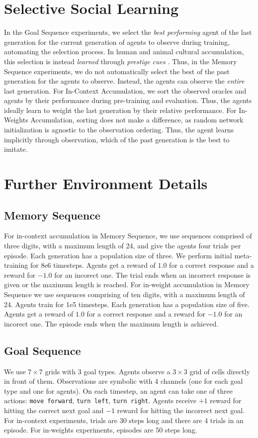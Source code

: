 \documentclass{article}
\begin{document}
\section{Selective Social Learning}
\label{selective}
In the Goal Sequence experiments, we select the \textit{best performing} agent of the last generation for the current generation of agents to observe during training, automating the selection process. In human and animal cultural accumulation, this selection is instead \textit{learned} through \textit{prestige cues} \cite{barkow1975prestige, horner2010prestige}. Thus, in the Memory Sequence experiments, we do not automatically select the best of the past generation for the agents to observe. Instead, the agents can observe the \textit{entire} last generation. For In-Context Accumulation, we sort the observed oracles and agents by their performance during pre-training and evaluation. Thus, the agents ideally learn to weight the last generation by their relative performance. For In-Weights Accumulation, sorting does not make a difference, as random network initialization is agnostic to the observation ordering. Thus, the agent learns implicitly through observation, which of the past generation is the best to imitate.
\newpage
\section{Further Environment Details}
\label{A:details}
\subsection{Memory Sequence}
For in-context accumulation in Memory Sequence, we use sequences comprised of three digits, with a maximum length of 24, and give the agents four trials per episode. Each generation has a population size of three. We perform initial meta-training for 8e6 timesteps. Agents get a reward of $1.0$ for a correct response and a reward for $-1.0$ for an incorect one. The trial ends when an incorrect response is given or the maximum length is reached.
For in-weight accumulation in Memory Sequence we use sequences comprising of ten digits, with a maximum length of 24. Agents train for 1e5 timesteps. Each generation has a population size of five. Agents get a reward of $1.0$ for a correct response and a reward for $-1.0$ for an incorect one. The episode ends when the maximum length is achieved.
\subsection{Goal Sequence}
We use $7 \times 7$ grids with 3 goal types. Agents observe a $3 \times 3$ grid of cells directly in front of them. Observations are symbolic with 4 channels (one for each goal type and one for agents). On each timestep, an agent can take one of three actions: \texttt{move forward}, \texttt{turn left}, \texttt{turn right}. Agents receive $+1$ reward for hitting the correct next goal and $-1$ reward for hitting the incorrect next goal. For in-context experiments, trials are 30 steps long and there are 4 trials in an episode. For in-weights experiments, episodes are 50 steps long.
\end{document}
